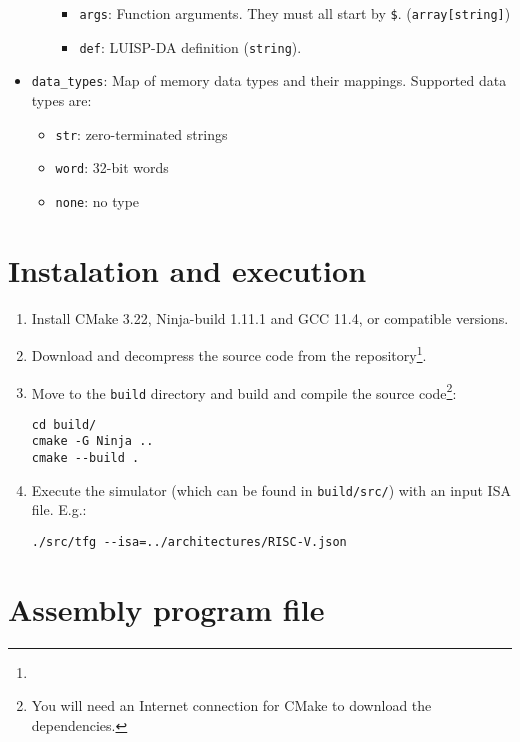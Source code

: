 \begin{itemize}[nosep,noitemsep]
\begin{itemize}
\begin{itemize}[nosep,noitemsep]
        \item \texttt{args}: Function arguments. They must all start by \texttt{\$}. (\texttt{array[string]})
        \item \texttt{def}: LUISP-DA definition (\texttt{string}).
      \end{itemize}
    \end{itemize}
  \item \texttt{data\_types}: Map of memory data types and their mappings.  
      Supported data types are:
      \begin{itemize}[nosep,noitemsep]
        \item \texttt{str}: zero-terminated strings
        \item \texttt{word}: 32-bit words
        \item \texttt{none}: no type
      \end{itemize}
\end{itemize}



\section*{Instalation and execution}

\begin{enumerate}
  \item Install CMake 3.22, Ninja-build 1.11.1 and GCC 11.4, or compatible versions.
  \item Download and decompress the source code from the repository\footnote{\myrepo}.
  \item Move to the \texttt{build} directory and build and compile the source code\footnote{You will need an Internet connection for CMake to download the dependencies.}:
  \begin{tcolorbox}[bottom=-8pt]
    \begin{verbatim}
cd build/
cmake -G Ninja ..
cmake --build .
    \end{verbatim}
  \end{tcolorbox}
  \item Execute the simulator (which can be found in \texttt{build/src/}) with an input \gls{ISA} file. E.g.:
  \begin{tcolorbox}[bottom=-8pt]
    \begin{verbatim}
./src/tfg --isa=../architectures/RISC-V.json
    \end{verbatim}
  \end{tcolorbox}
\end{enumerate}


\section*{Assembly program file}